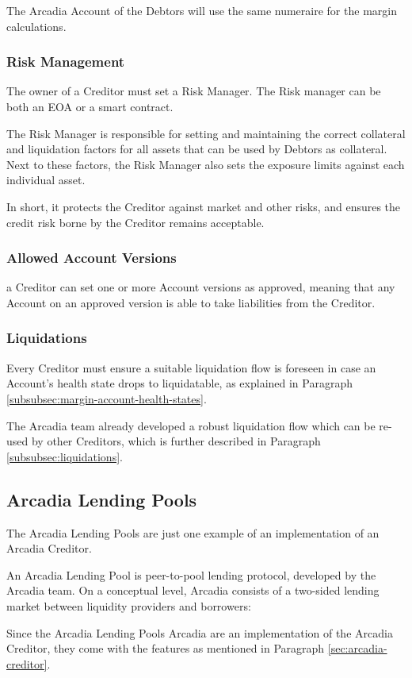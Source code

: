 \documentclass[sigconf,nonacm]{acmart}
\begin{document}
The Arcadia Account of the Debtors will use the same numeraire for the margin calculations.

\subsubsection{Risk Management}
The owner of a Creditor must set a Risk Manager.
The Risk manager can be both an EOA or a smart contract.

The Risk Manager is responsible for setting and maintaining the correct collateral and liquidation factors for all assets that can be used by Debtors as collateral.
Next to these factors, the Risk Manager also sets the exposure limits against each individual asset. 

In short, it protects the Creditor against market and other risks, and ensures the credit risk borne by the Creditor remains acceptable.

\subsubsection{Allowed Account Versions}
a Creditor can set one or more Account versions as approved,
meaning that any Account on an approved version is able to take liabilities from the Creditor.

\subsubsection{Liquidations}
Every Creditor must ensure a suitable liquidation flow is foreseen in case an Account's health state drops to liquidatable,
as explained in Paragraph \ref{subsubsec:margin-account-health-states}.

The Arcadia team already developed a robust liquidation flow which can be re-used by other Creditors,
which is further described in Paragraph \ref{subsubsec:liquidations}.

\subsection{Arcadia Lending Pools}
The Arcadia Lending Pools are just one example of an implementation of an Arcadia Creditor.

An Arcadia Lending Pool is peer-to-pool lending protocol, developed by the Arcadia team.
On a conceptual level, Arcadia consists of a two-sided lending market between liquidity providers and borrowers:

Since the Arcadia Lending Pools Arcadia are an implementation of the Arcadia Creditor,
they come with the features as mentioned in Paragraph \ref{sec:arcadia-creditor}.
\end{document}
